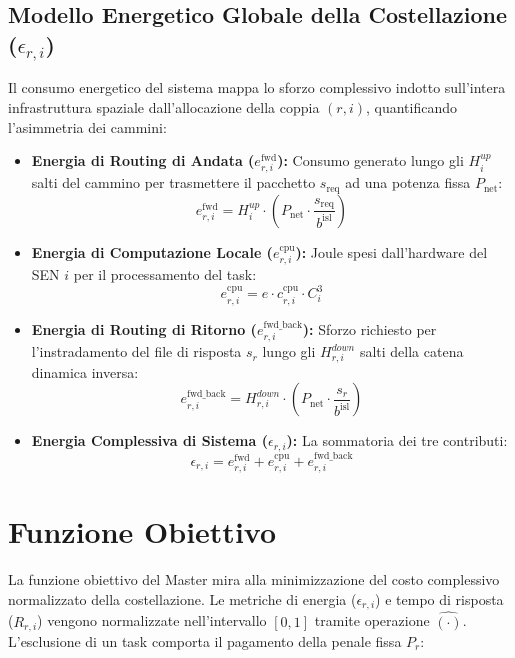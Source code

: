 \documentclass[12pt]{article}
\begin{document}
\subsection{Modello Energetico Globale della Costellazione ($\epsilon_{r,i}$)}
Il consumo energetico del sistema mappa lo sforzo complessivo indotto sull'intera infrastruttura spaziale dall'allocazione della coppia $(r,i)$, quantificando l'asimmetria dei cammini:
\begin{itemize}
    \item \textbf{Energia di Routing di Andata ($e_{r,i}^{\text{fwd}}$):} Consumo generato lungo gli $H_i^{up}$ salti del cammino per trasmettere il pacchetto $s_{\text{req}}$ ad una potenza fissa $P_{\text{net}}$:
    \begin{equation}
    e_{r,i}^{\text{fwd}} = H_i^{up} \cdot \left( P_{\text{net}} \cdot \frac{s_{\text{req}}}{b^{\text{isl}}} \right)
    \end{equation}

    \item \textbf{Energia di Computazione Locale ($e_{r,i}^{\text{cpu}}$):} Joule spesi dall'hardware del SEN $i$ per il processamento del task:
    \begin{equation}
    e_{r,i}^{\text{cpu}} = e \cdot c_{r,i}^{\text{cpu}} \cdot C_i^3
    \end{equation}
    
    \item \textbf{Energia di Routing di Ritorno ($e_{r,i}^{\text{fwd\_back}}$):} Sforzo richiesto per l'instradamento del file di risposta $s_r$ lungo gli $H_{r,i}^{down}$ salti della catena dinamica inversa:
    \begin{equation}
    e_{r,i}^{\text{fwd\_back}} = H_{r,i}^{down} \cdot \left( P_{\text{net}} \cdot \frac{s_r}{b^{\text{isl}}} \right)
    \end{equation}
    
    \item \textbf{Energia Complessiva di Sistema ($\epsilon_{r,i}$):} La sommatoria dei tre contributi:
    \begin{equation}
    \epsilon_{r,i} = e_{r,i}^{\text{fwd}} + e_{r,i}^{\text{cpu}} + e_{r,i}^{\text{fwd\_back}}
    \end{equation}
\end{itemize}

\section{Funzione Obiettivo}
La funzione obiettivo del Master mira alla minimizzazione del costo complessivo normalizzato della costellazione. Le metriche di energia ($\epsilon_{r,i}$) e tempo di risposta ($R_{r,i}$) vengono normalizzate nell'intervallo $[0, 1]$ tramite operazione $\widehat{(\cdot)}$. L'esclusione di un task comporta il pagamento della penale fissa $P_r$:
\end{document}

